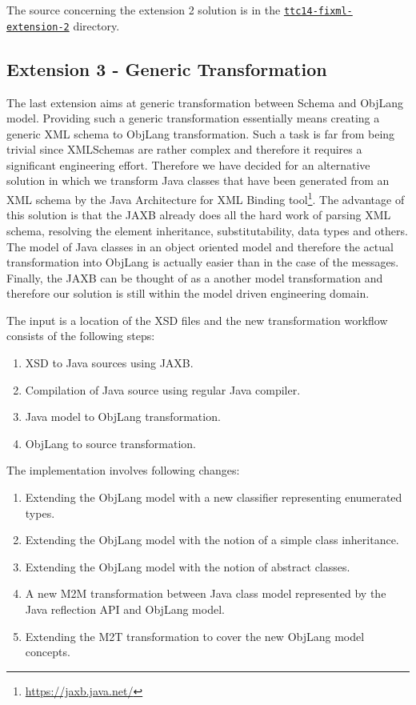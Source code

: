 The source concerning the extension 2 solution is in the \href{https://github.com/fikovnik/ttc14-fixml-sigma/tree/master/ttc14-fixml-extension-2}{\texttt{ttc14-fixml-extension-2}} directory.

\subsection{Extension 3 - Generic Transformation}
\label{sec:Extension3}

The last extension aims at generic transformation between \FIXML Schema and ObjLang model.
Providing such a generic transformation essentially means creating a generic XML schema to ObjLang transformation.
Such a task is far from being trivial since XMLSchemas are rather complex and therefore it requires a significant engineering effort.
Therefore we have decided for an alternative solution in which we transform Java classes that have been generated from an XML schema by the Java Architecture for XML Binding tool\footnote{\url{https://jaxb.java.net/}}.
The advantage of this solution is that the JAXB already does all the hard work of parsing XML schema, resolving the element inheritance, substitutability, data types and others.
The model of Java classes in an object oriented model and therefore the actual transformation into ObjLang is actually easier than in the case of the \FIXML messages.
Finally, the JAXB can be thought of as a another model transformation and therefore our solution is still within the model driven engineering domain.

The input is a location of the \FIXML XSD files and the new transformation workflow consists of the following steps:
\begin{enumerate}[(1)]
	\item XSD to Java sources using JAXB.
	\item Compilation of Java source using regular Java compiler.
	\item Java model to ObjLang transformation.
	\item ObjLang to source transformation.
\end{enumerate}

The implementation involves following changes:
\begin{enumerate}[(1)]
	\item Extending the ObjLang model with a new classifier representing enumerated types.
	\item Extending the ObjLang model with the notion of a simple class inheritance.
	\item Extending the ObjLang model with the notion of abstract classes.
	\item A new M2M transformation between Java class model represented by the Java reflection API and ObjLang model.
	\item Extending the M2T transformation to cover the new ObjLang model concepts.
\end{enumerate}

